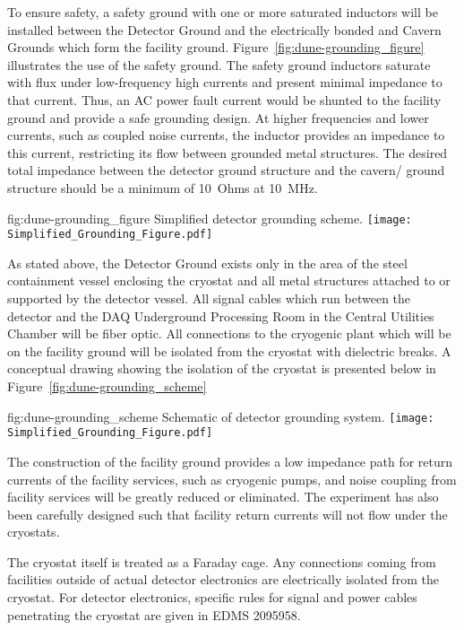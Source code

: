 To ensure safety, a safety ground with one or more saturated inductors
will be installed between the Detector Ground and the electrically
bonded  and Cavern Grounds which form the facility ground.
Figure~\ref{fig:dune-grounding_figure} illustrates the use of the
safety ground. The safety ground inductors saturate with flux under
low-frequency high currents and present minimal impedance to that
current.  Thus, an AC power fault current would be shunted to the
facility ground and provide a safe grounding design. At higher
frequencies and lower currents, such as coupled noise currents, the
inductor provides an impedance to this current, restricting its flow
between grounded metal structures. The desired total impedance between
the detector ground structure and the cavern/ ground
structure should be a minimum of \SI{10}{Ohms} at \SI{10}{MHz}.

\begin{dunefigure}{fig:dune-grounding_figure}
  {Simplified detector grounding scheme.}
  \texttt{[image: Simplified\_Grounding\_Figure.pdf]}
\end{dunefigure}

As stated above, the Detector Ground exists only in the area of the steel containment vessel enclosing the cryostat and all metal structures attached to or supported by the detector vessel.  All signal cables which run between the detector and the DAQ Underground Processing Room in the Central Utilities Chamber will be fiber optic.  All connections to the cryogenic plant which will be on the facility ground will be isolated from the cryostat with dielectric breaks.  A conceptual drawing showing the isolation of the cryostat is presented below in Figure~\ref{fig:dune-grounding_scheme}

\begin{dunefigure}{fig:dune-grounding_scheme}
  {Schematic of detector grounding system.}
  \texttt{[image: Simplified\_Grounding\_Figure.pdf]}
\end{dunefigure}
The construction of the facility ground provides a low impedance path for return currents of the facility services, such as cryogenic pumps, and noise coupling from facility services will be greatly reduced or eliminated.  The experiment has also been carefully designed such that facility return currents will not flow under the cryostats.

The cryostat itself is treated as a Faraday cage.  Any connections coming from facilities outside of actual detector electronics are electrically isolated from the cryostat.  For detector electronics, specific rules for signal and power cables penetrating the cryostat are given in EDMS 2095958.  





